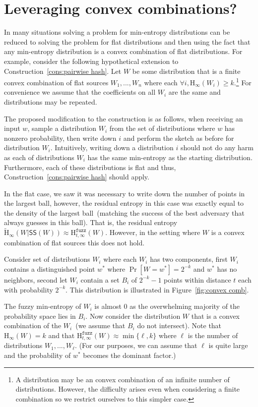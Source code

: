 \documentclass[11pt]{article}
\newcommand{\consref}[1]{\mbox{Construction~\ref{#1}}}
\newcommand{\figref}[1]{\mbox{Figure~\ref{#1}}}
\newcommand{\class}[1]{{\ensuremath{\mathsf{#1}}}}
\newcommand{\sketch}{\ensuremath{\class{SS}}\xspace}
\newcommand{\Hoo}{\mathrm{H}_\infty}
\newcommand{\Hav}{\tilde{\mathrm{H}}_\infty}
\newcommand{\Hfuzz}{\mathrm{H}^{\mathtt{fuzz}}_{t,\infty}}
\begin{document}
\section{Leveraging convex combinations?}
\label{sec:convex comb}
In many situations solving a problem for min-entropy distributions can be reduced to solving the problem for flat distributions and then using the fact that any min-entropy distribution is a convex combination of flat distributions.  For example, consider the following hypothetical extension to \consref{cons:pairwise hash}.  Let $W$ be some distribution that is a finite convex combination of flat sources $W_1,..., W_n$ where each $\forall i, \Hoo(W_i)\ge k$.\footnote{A distribution may be an  convex combination of an infinite number of distributions.  However, the difficulty arises even when considering a finite combination so we restrict ourselves to this simpler case.}  For convenience we assume that the coefficients on all $W_i$ are the same and distributions may be repeated. 

The proposed modification to the construction is as follows, when receiving an input $w$, sample a distribution $W_i$ from the set of distributions where $w$ has nonzero probability, then write down $i$ and perform the sketch as before for distribution $W_i$.  Intuitively, writing down a distribution $i$ should not do any harm as each of distributions $W_i$ has the same min-entropy as the starting distribution.  Furthermore, each of these distributions is flat and thus, \consref{cons:pairwise hash} should apply.

In the flat case, we saw it was necessary to write down the number of points in the largest ball, however, the residual entropy in this case was exactly equal to the density of the largest ball~(matching the success of the best adversary that always guesses in this ball).  That is, the residual entropy $\Hav(W|\sketch(W)) \approx \Hfuzz(W)$.  However, in the setting where $W$ is a convex combination of flat sources this does not hold.

Consider set of distributions $W_i$ where each $W_i$ has two components, first $W_i$ contains a distinguished point $w^*$ where $\Pr[W=w^*] = 2^{-k}$ and $w^*$ has no neighbors, second let $W_i$ contain a set $B_i$ of $2^{-k}-1$ points within distance $t$ each with probability $2^{-k}$.  This distribution is illustrated in \figref{fig:convex comb}.  

The fuzzy min-entropy of $W_i$ is almost $0$ as the overwhelming majority of the probability space lies in $B_i$.  Now consider the distribution $W$ that is a convex combination of the $W_i$~(we assume that $B_i$ do not intersect).  Note that $\Hoo(W)=k$ and that $\Hfuzz(W)\approx \min\{\ell, k\}$ where $\ell$ is the number of distributions $W_1,..., W_\ell$.  (For our purposes, we can assume that $\ell$ is quite large and the probability of $w^*$ becomes the dominant factor.)
\end{document}
